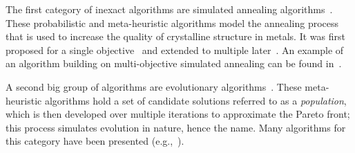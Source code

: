 The first category of inexact algorithms are simulated annealing algorithms~\autocite{Saini2021}.
These probabilistic and meta-heuristic algorithms model the annealing process that is used to increase the quality of crystalline structure in metals.
It was first proposed for a single objective~\autocite{DBLP:journals/science/KirkpatrickGV83} and extended to multiple later~\autocite{DBLP:journals/tec/BandyopadhyaySMD08}.
An example of an algorithm building on multi-objective simulated annealing can be found in~\textcite{DBLP:journals/isci/SenguptaS18}.

A second big group of algorithms are evolutionary algorithms~\autocites{Saini2021,DBLP:books/daglib/0087893}.
These meta-heuristic algorithms hold a set of candidate solutions referred to as a \emph{population}, which is then developed over multiple iterations to approximate the Pareto front;
this process simulates evolution in nature, hence the name.
Many algorithms for this category have been presented (e.g.,~\autocites{DBLP:journals/jgo/StornP97,DBLP:journals/tec/DebAPM02}).